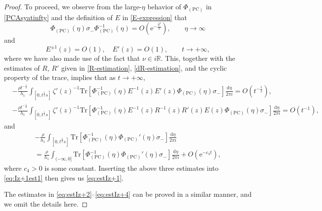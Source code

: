 \documentclass[11pt,a4paper]{article}
\numberwithin{equation}{section}
\begin{document}
\begin{proof}
To proceed, we observe from the large-$\eta$ behavior of $\Phi_{(\mathrm{PC})}$ in
\eqref{PCAsyatinfty} and the definition of $E$ in \eqref{E-expression} that
$$
\Phi_{(\mathrm{PC})}(\eta)\sigma_-\Phi_{(\mathrm{PC})}^{-1}(\eta)
=O\left(\mathrm{e}^{-\frac{\eta^2}{2}}\right), \qquad \eta\to\infty
$$
and
\begin{equation}\label{E-estimate}
E^{\pm1}(z)=O(1),\quad E'(z)=O(1),\qquad t\to+\infty,
\end{equation}
where we have also made use of the fact that $\nu\in{i\mathbb{R}}$. This, together with the estimates of $R$, $R'$ given in \eqref{R-estimation}, \eqref{dR-estimation}, and the cyclic property of the trace, implies that as $t\to+\infty$,
\begin{align*}
&-\frac{\rho t^{-\frac{1}{2}}}{h_1}\int_{[0,t^{\frac{1}{2}}s]}\zeta'(z)^{-1}
\mathrm{Tr}\left[\Phi_{(\mathrm{PC})}^{-1}(\eta)E^{-1}(z)E'(z)\Phi_{(\mathrm{PC})}(\eta)
\sigma_-\right]\frac{\mathrm{d}\eta}{2\pi i}=O\left(t^{-\frac{1}{2}}\right),\\
&-\frac{\rho t^{-\frac{1}{2}}}{h_1}\int_{[0,t^{\frac{1}{2}}s]}\zeta'(z)^{-1}
\mathrm{Tr}\left[\Phi_{(\mathrm{PC})}^{-1}(\eta)E^{-1}(z)R^{-1}(z)R'(z)E(z)
\Phi_{(\mathrm{PC})}(\eta)\sigma_-\right]\frac{\mathrm{d}\eta}{2\pi i}
=O\left(t^{-1}\right),
\end{align*}
and
\begin{multline*}
-\frac{\rho}{h_1}\int_{[0,t^{\frac{1}{2}}s]}
 \mathrm{Tr}\left[\Phi_{(\mathrm{PC})}^{-1}(\eta)\Phi_{(\mathrm{PC})}'(\eta)
\sigma_-\right]\frac{\mathrm{d}\eta}{2\pi i}\\
=\frac{\rho}{h_1}\int_{(-\infty,0]}
\mathrm{Tr}\left[\Phi_{(\mathrm{PC})}^{-1}(\eta)\Phi_{(\mathrm{PC})}'(\eta)
\sigma_-\right]\frac{\mathrm{d}\eta}{2\pi i}+O\left(\mathrm{e}^{-c_4t}\right),
\end{multline*}
where $c_4>0$ is some constant. Inserting the above three estimates into \eqref{eq:Iz+1est1} then gives us \eqref{eq:estIz+1}.

The estimates in \eqref{eq:estIz+2}--\eqref{eq:estIz+4} can be proved in a similar manner, and we omit the details here.
\end{proof}
\end{document}
